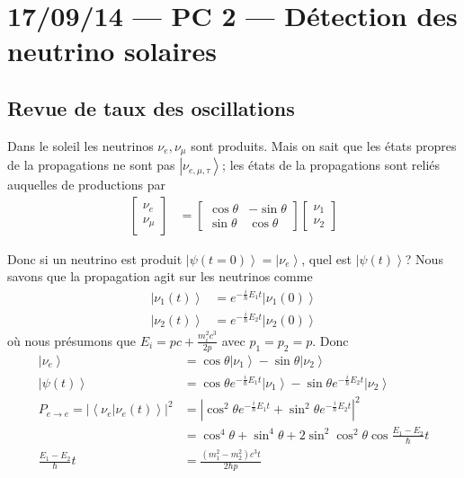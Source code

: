 \documentclass[10pt]{report}
\newcommand{\ket}[1]{\left|#1\right>}
\newcommand{\dotp}[2]{\left<#1\left.\right|#2\right>}
\newcommand{\abs}[1]{\left|#1\right|}
\begin{document}
\chapter{17/09/14 --- PC 2 --- D\'etection des neutrino solaires}

\section{Revue de taux des oscillations}

Dans le soleil les neutrinos $\nu_e, \nu_\mu$ sont produits. Mais on sait que les \'etats propres de la propagations ne sont pas $\ket{\nu_{e, \mu, \tau}}$; les \'etats de la propagations sont reli\'es auquelles de productions par
\begin{align}
    \begin{bmatrix} \nu_e \\ \nu_\mu \end{bmatrix}  &= \begin{bmatrix} \cos\theta & -\sin\theta \\ \sin\theta & \cos\theta \end{bmatrix} \begin{bmatrix} \nu_1 \\ \nu_2 \end{bmatrix} 
\end{align}

Donc si un neutrino est produit $\ket{\psi(t=0)} = \ket{\nu_e}$, quel est $\ket{\psi(t)}$? Nous savons que la propagation agit sur les neutrinos comme
\begin{align}
    \ket{\nu_1(t)} &= e^{-\frac{i}{\hbar}E_1t}\ket{\nu_1(0)}\\
    \ket{\nu_2(t)} &= e^{-\frac{i}{\hbar}E_2t}\ket{\nu_2(0)}
\end{align}
o\`u nous pr\'esumons que $E_i = pc + \frac{m_i^2c^3}{2p}$ avec $p_1 = p_2 = p$. Donc
\begin{align}
    \ket{\nu_e} &= \cos\theta\ket{\nu_1} - \sin\theta\ket{\nu_2}\\
    \ket{\psi(t)} &= \cos\theta e^{-\frac{i}{\hbar}E_1 t}\ket{\nu_1} - \sin\theta e^{-\frac{i}{\hbar}E_2t}\ket{\nu_2}\\
    P_{e \to e} = \abs{\dotp{\nu_e}{\nu_e(t)}}^2 &= \abs{\cos^2\theta e^{-\frac{i}{\hbar}E_1t} + \sin^2\theta e^{-\frac{i}{\hbar}E_2t}}^2\\
    &= \cos^4\theta + \sin^4\theta + 2\sin^2\cos^2\theta\cos\frac{E_1 - E_2}{\hbar}t\\
    \frac{E_1 - E_2}{\hbar}t &= \frac{(m_1^2 - m_2^2)c^3t}{2\hbar p}
\end{align}
\end{document}
